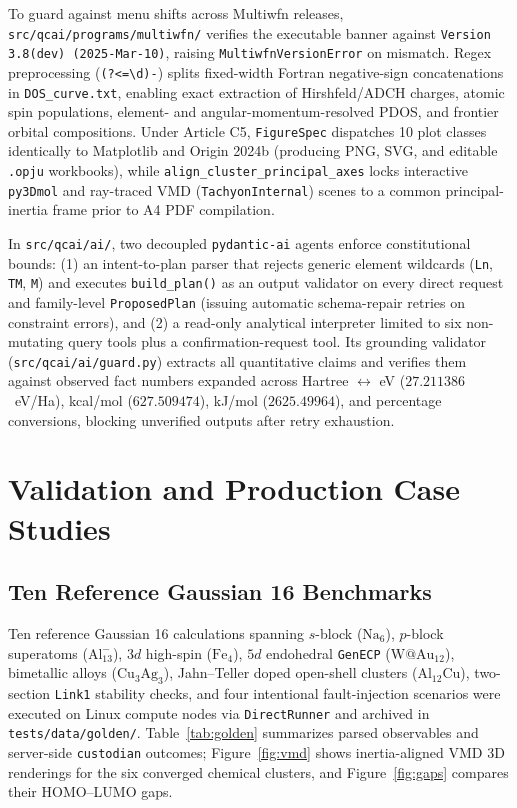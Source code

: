 \documentclass[journal=jctcce,manuscript=article]{achemso}
\begin{document}
To guard against menu shifts across Multiwfn releases, \texttt{src/qcai/programs/multiwfn/} verifies the executable banner against \texttt{Version 3.8(dev) (2025-Mar-10)}, raising \texttt{MultiwfnVersionError} on mismatch. Regex preprocessing (\texttt{(?<=\textbackslash d)-}) splits fixed-width Fortran negative-sign concatenations in \texttt{DOS\_curve.txt}, enabling exact extraction of Hirshfeld/ADCH charges, atomic spin populations, element- and angular-momentum-resolved PDOS, and frontier orbital compositions. Under Article C5, \texttt{FigureSpec} dispatches 10 plot classes identically to Matplotlib and Origin 2024b (producing PNG, SVG, and editable \texttt{.opju} workbooks), while \texttt{align\_cluster\_principal\_axes} locks interactive \texttt{py3Dmol} and ray-traced VMD (\texttt{TachyonInternal}) scenes to a common principal-inertia frame prior to A4 PDF compilation.

In \texttt{src/qcai/ai/}, two decoupled \texttt{pydantic-ai} agents enforce constitutional bounds: (1) an intent-to-plan parser that rejects generic element wildcards (\texttt{Ln}, \texttt{TM}, \texttt{M}) and executes \texttt{build\_plan()} as an output validator on every direct request and family-level \texttt{ProposedPlan} (issuing automatic schema-repair retries on constraint errors), and (2) a read-only analytical interpreter limited to six non-mutating query tools plus a confirmation-request tool. Its grounding validator (\texttt{src/qcai/ai/guard.py}) extracts all quantitative claims and verifies them against observed fact numbers expanded across Hartree $\leftrightarrow$ eV ($27.211386$~eV/Ha), kcal/mol ($627.509474$), kJ/mol ($2625.49964$), and percentage conversions, blocking unverified outputs after retry exhaustion.

\section{Validation and Production Case Studies}

\subsection{Ten Reference Gaussian 16 Benchmarks}

Ten reference Gaussian 16 calculations spanning $s$-block ($\mathrm{Na_6}$), $p$-block superatoms ($\mathrm{Al_{13}^-}$), $3d$ high-spin ($\mathrm{Fe_4}$), $5d$ endohedral \texttt{GenECP} ($\mathrm{W@Au_{12}}$), bimetallic alloys ($\mathrm{Cu_3Ag_3}$), Jahn--Teller doped open-shell clusters ($\mathrm{Al_{12}Cu}$), two-section \texttt{Link1} stability checks, and four intentional fault-injection scenarios were executed on Linux compute nodes via \texttt{DirectRunner} and archived in \texttt{tests/data/golden/}. Table~\ref{tab:golden} summarizes parsed observables and server-side \texttt{custodian} outcomes; Figure~\ref{fig:vmd} shows inertia-aligned VMD 3D renderings for the six converged chemical clusters, and Figure~\ref{fig:gaps} compares their HOMO--LUMO gaps.
\end{document}

